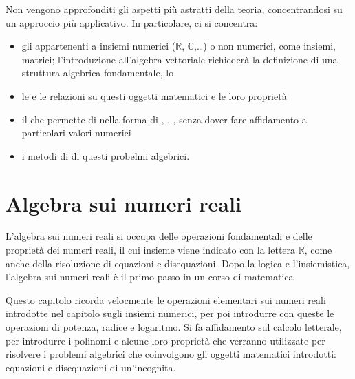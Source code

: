 \documentclass[letterpaper,10pt,italian]{jupyterBook}
\begin{document}
\sphinxAtStartPar
Non vengono approfonditi gli aspetti più astratti della teoria, concentrandosi su un approccio più applicativo. In particolare, ci si concentra:
\begin{itemize}
\item {} 
\sphinxAtStartPar
gli  appartenenti a insiemi numerici (\(\mathbb{R}\), \(\mathbb{C}\),…) o non numerici, come insiemi, matrici; l’introduzione all’algebra vettoriale richiederà la definizione di una struttura algebrica fondamentale, lo 

\item {} 
\sphinxAtStartPar
le  e le relazioni su questi oggetti matematici e le loro proprietà

\item {} 
\sphinxAtStartPar
il  che permette di {\hyperref[\detokenize{ch/program/delta:math-hs-program-delta}]{}} nella forma di , , , senza dover fare affidamento a particolari valori numerici

\item {} 
\sphinxAtStartPar
i metodi di  di questi probelmi algebrici.

\end{itemize}

\sphinxstepscope




\chapter{Algebra sui numeri reali}
\label{\detokenize{ch/algebra/real-algebra:algebra-sui-numeri-reali}}\label{\detokenize{ch/algebra/real-algebra:math-hs-algebra-real}}\label{\detokenize{ch/algebra/real-algebra::doc}}
\sphinxAtStartPar
L’algebra sui numeri reali si occupa delle operazioni fondamentali e delle proprietà dei numeri reali, il cui insieme viene indicato con la lettera \(\mathbb{R}\), come anche della risoluzione di equazioni e disequazioni. Dopo la logica e l’insiemistica, l’algebra sui numeri reali è il primo passo in un corso di matematica  

\sphinxAtStartPar
Questo capitolo ricorda velocmente le operazioni elementari sui numeri reali introdotte nel capitolo sugli insiemi numerici, per poi introdurre con queste le operazioni di potenza, radice e logaritmo. Si fa affidamento sul calcolo letterale, per introdurre i polinomi e alcune loro proprietà che verranno utilizzate per risolvere i problemi algebrici che coinvolgono gli oggetti matematici introdotti: equazioni e disequazioni di un’incognita.
\end{document}
